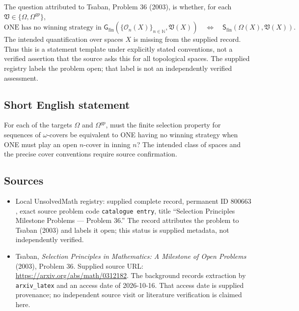 \documentclass[11pt]{article}
\newcommand{\N}{\mathbb{N}}
\begin{document}
The question attributed to Tsaban, Problem 36 (2003), is whether, for each \(\mathfrak V\in\{\Omega,\Omega^{gp}\}\),
\[
\text{ONE has no winning strategy in }\mathsf G_{\mathrm{fin}}(\{\mathcal O_n(X)\}_{n\in\N},\mathfrak V(X))
\quad\Longleftrightarrow\quad
\mathsf S_{\mathrm{fin}}(\Omega(X),\mathfrak V(X)).
\]
The intended quantification over spaces \(X\) is missing from the supplied record. Thus this is a statement template under explicitly stated conventions, not a verified assertion that the source asks this for all topological spaces. The supplied registry labels the problem open; that label is not an independently verified assessment.
\subsection{Short English statement}
For each of the targets \(\Omega\) and \(\Omega^{gp}\), must the finite selection property for sequences of \(\omega\)-covers be equivalent to ONE having no winning strategy when ONE must play an open \(n\)-cover in inning \(n\)? The intended class of spaces and the precise cover conventions require source confirmation.
\subsection{Sources}
\begin{itemize}
\item Local UnsolvedMath registry: supplied complete record, permanent ID \(800663\), exact source problem code \texttt{catalogue entry}, title ``Selection Principles Milestone Problems --- Problem 36.'' The record attributes the problem to Tsaban (2003) and labels it open; this status is supplied metadata, not independently verified.
\item Tsaban, \emph{Selection Principles in Mathematics: A Milestone of Open Problems} (2003), Problem 36. Supplied source URL: \url{https://arxiv.org/abs/math/0312182}. The background records extraction by \texttt{arxiv\_latex} and an access date of 2026-10-16. That access date is supplied provenance; no independent source visit or literature verification is claimed here.
\end{itemize}
\end{document}
